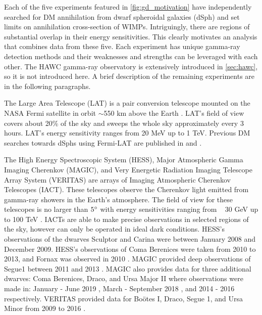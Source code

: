 Each of the five experiments featured in \cref{fig:gd_motivation} have independently searched for DM annihilation from dwarf spheroidal galaxies (dSph) and set limits on annihilation cross-section of WIMPs.
Intriguingly, there are regions of substantial overlap in their energy sensitivities.
This clearly motivates an analysis that combines data from these five.
Each experiment has unique gamma-ray detection methods and their weaknesses and strengths can be leveraged with each other.
The HAWC gamma-ray observatory is extensively introduced in \cref{sec:hawc}, so it is not introduced here.
A brief description of the remaining experiments are in the following paragraphs.

The Large Area Telescope (LAT) is a pair conversion telescope mounted on the NASA Fermi satellite in orbit $\sim$550 km above the Earth \cite{FermiLAT}.
LAT's field of view covers about 20\% of the sky and sweeps the whole sky approximately every 3 hours.
LAT's energy sensitivity ranges from 20 MeV up to 1 TeV.
Previous DM searches towards dSphs using Fermi-LAT are published in \cite{FermiLAT:dm1} and \cite{FermiLAT:dm2}.

\sloppy The High Energy Spectroscopic System (HESS), Major Atmospheric Gamma Imaging
Cherenkov (MAGIC), and Very Energetic Radiation Imaging Telescope Array System (VERITAS) are arrays of Imaging Atmospheric Cherenkov Telescopes (IACT).
These telescopes observe the Cherenkov light emitted from gamma-ray showers in the Earth's atmosphere.
The field of view for these telescopes is no larger than $5\degree$ with energy sensitivities ranging from ~ 30 GeV up to 100 TeV \cite{HESS,MAGIC,VERITAS}.
IACTs are able to make precise observations in selected regions of the sky, however can only be operated in ideal dark conditions.
HESS's  observations of the dwarves Sculptor and Carina were between January 2008 and December 2009.
HESS's observations of Coma Berenices were taken from 2010 to 2013, and Fornax was observed in 2010 \cite{HESS:dm_sculptor_carina,HESS:dm_dwarves,HESS:dm_gamma_lines}.
MAGIC provided deep observations of Segue1 between 2011 and 2013 \cite{MAGIC:dm_segue1}.
MAGIC also provides data for three additional dwarves: Coma Berenices, Draco, and Ursa Major II where observations were made in: January - June 2019 \cite{MAGIC:dm_comab_draco}, March - September 2018 \cite{MAGIC:dm_comab_draco}, and 2014 - 2016 \cite{MAGIC:dm_uma2} respectively.
VERITAS provided data for Boötes I, Draco, Segue 1, and Ursa Minor from 2009 to 2016 \cite{VERITAS:dm_dwarves}.

